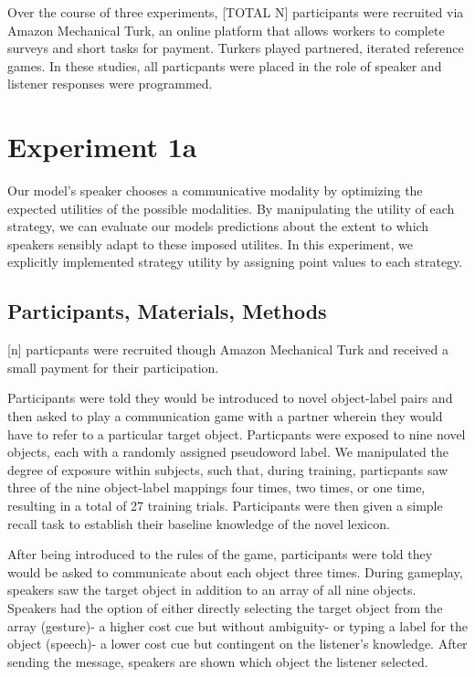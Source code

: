 \documentclass[10pt, letterpaper]{article}
\begin{document}
Over the course of three experiments, {[}TOTAL N{]} participants were
recruited via Amazon Mechanical Turk, an online platform that allows
workers to complete surveys and short tasks for payment. Turkers played
partnered, iterated reference games. In these studies, all particpants
were placed in the role of speaker and listener responses were
programmed.

\section{Experiment 1a}\label{experiment-1a}

Our model's speaker chooses a communicative modality by optimizing the
expected utilities of the possible modalities. By manipulating the
utility of each strategy, we can evaluate our models predictions about
the extent to which speakers sensibly adapt to these imposed utilites.
In this experiment, we explicitly implemented strategy utility by
assigning point values to each strategy.

\subsection{Participants, Materials,
Methods}\label{participants-materials-methods}

{[}n{]} particpants were recruited though Amazon Mechanical Turk and
received a small payment for their participation.

Participants were told they would be introduced to novel object-label
pairs and then asked to play a communication game with a partner wherein
they would have to refer to a particular target object. Particpants were
exposed to nine novel objects, each with a randomly assigned pseudoword
label. We manipulated the degree of exposure within subjects, such that,
during training, particpants saw three of the nine object-label mappings
four times, two times, or one time, resulting in a total of 27 training
trials. Participants were then given a simple recall task to establish
their baseline knowledge of the novel lexicon.

After being introduced to the rules of the game, participants were told
they would be asked to communicate about each object three times. During
gameplay, speakers saw the target object in addition to an array of all
nine objects. Speakers had the option of either directly selecting the
target object from the array (gesture)- a higher cost cue but without
ambiguity- or typing a label for the object (speech)- a lower cost cue
but contingent on the listener's knowledge. After sending the message,
speakers are shown which object the listener selected.
\end{document}

